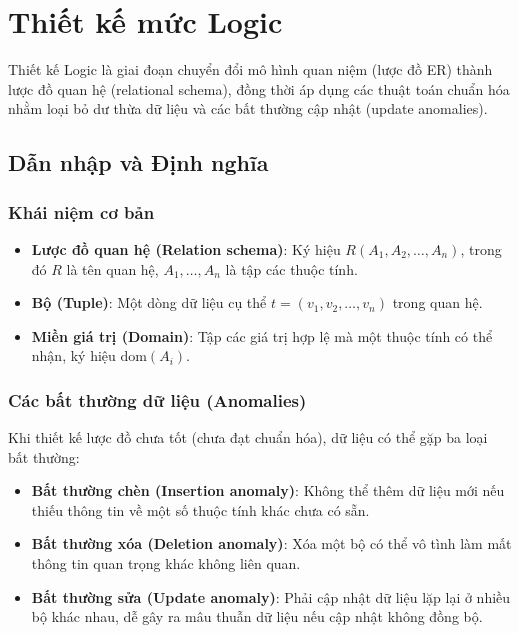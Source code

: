 \chapter{Thiết kế mức Logic}
\label{chap:chuong2_logic}

Thiết kế Logic là giai đoạn chuyển đổi mô hình quan niệm (lược đồ ER) thành lược đồ quan hệ (relational schema), đồng thời áp dụng các thuật toán chuẩn hóa nhằm loại bỏ dư thừa dữ liệu và các bất thường cập nhật (update anomalies).

\section{Dẫn nhập và Định nghĩa}

\subsection{Khái niệm cơ bản}
\begin{itemize}
    \item \textbf{Lược đồ quan hệ (Relation schema)}: Ký hiệu $R(A_1, A_2, \ldots, A_n)$, trong đó $R$ là tên quan hệ, $A_1, \ldots, A_n$ là tập các thuộc tính.
    \item \textbf{Bộ (Tuple)}: Một dòng dữ liệu cụ thể $t = (v_1, v_2, \ldots, v_n)$ trong quan hệ.
    \item \textbf{Miền giá trị (Domain)}: Tập các giá trị hợp lệ mà một thuộc tính có thể nhận, ký hiệu $\text{dom}(A_i)$.
\end{itemize}

\subsection{Các bất thường dữ liệu (Anomalies)}
Khi thiết kế lược đồ chưa tốt (chưa đạt chuẩn hóa), dữ liệu có thể gặp ba loại bất thường:
\begin{itemize}
    \item \textbf{Bất thường chèn (Insertion anomaly)}: Không thể thêm dữ liệu mới nếu thiếu thông tin về một số thuộc tính khác chưa có sẵn.
    \item \textbf{Bất thường xóa (Deletion anomaly)}: Xóa một bộ có thể vô tình làm mất thông tin quan trọng khác không liên quan.
    \item \textbf{Bất thường sửa (Update anomaly)}: Phải cập nhật dữ liệu lặp lại ở nhiều bộ khác nhau, dễ gây ra mâu thuẫn dữ liệu nếu cập nhật không đồng bộ.
\end{itemize}

